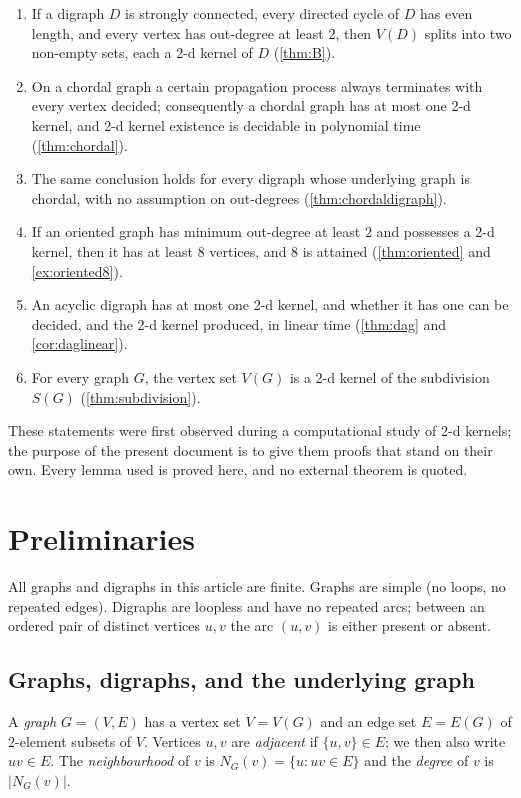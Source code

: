 \documentclass[11pt]{article}
\numberwithin{equation}{section}
\theoremstyle{plain}
\newcommand{\V}{V}
\begin{document}
\begin{enumerate}[label=\textup{(\roman*)},leftmargin=2.6em]
\item If a digraph $D$ is strongly connected, every directed cycle of $D$ has even
length, and every vertex has out-degree at least $2$, then $\V(D)$ splits into two
non-empty sets, each a 2-d kernel of $D$ (\cref{thm:B}).
\item On a chordal graph a certain propagation process always terminates with every
vertex decided; consequently a chordal graph has at most one 2-d kernel, and 2-d kernel
existence is decidable in polynomial time (\cref{thm:chordal}).
\item The same conclusion holds for every digraph whose underlying graph is chordal,
with no assumption on out-degrees (\cref{thm:chordaldigraph}).
\item If an oriented graph has minimum out-degree at least $2$ and possesses a 2-d kernel,
then it has at least $8$ vertices, and $8$ is attained (\cref{thm:oriented} and
\cref{ex:oriented8}).
\item An acyclic digraph has at most one 2-d kernel, and whether it has one can be decided,
and the 2-d kernel produced, in linear time (\cref{thm:dag} and \cref{cor:daglinear}).
\item For every graph $G$, the vertex set $\V(G)$ is a 2-d kernel of the subdivision
$S(G)$ (\cref{thm:subdivision}).
\end{enumerate}

These statements were first observed during a computational study of 2-d kernels; the
purpose of the present document is to give them proofs that stand on their own. Every
lemma used is proved here, and no external theorem is quoted.

\section{Preliminaries}

All graphs and digraphs in this article are finite. Graphs are simple (no loops, no
repeated edges). Digraphs are loopless and have no repeated arcs; between an ordered pair
of distinct vertices $u,v$ the arc $(u,v)$ is either present or absent.

\subsection{Graphs, digraphs, and the underlying graph}

A \emph{graph} $G=(\V,E)$ has a vertex set $\V=\V(G)$ and an edge set $E=E(G)$ of
$2$-element subsets of $\V$. Vertices $u,v$ are \emph{adjacent} if $\{u,v\}\in E$; we then
also write $uv\in E$. The \emph{neighbourhood} of $v$ is $N_G(v)=\{u:uv\in E\}$ and the
\emph{degree} of $v$ is $|N_G(v)|$.
\end{document}
